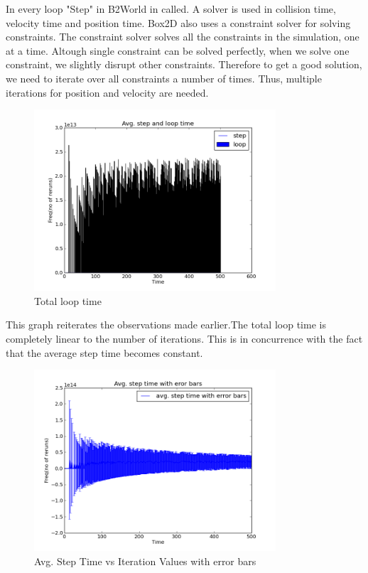 \documentclass[11pt]{article}
\begin{document}
In every loop "Step" in B2World in called. A solver is used in collision time, velocity time and position time. Box2D also uses a constraint solver for solving constraints. The constraint solver solves all the constraints in the simulation, one at a time. Altough single constraint can be solved perfectly, when we solve one constraint, we slightly disrupt other constraints. Therefore to get a good solution, we need to iterate over all constraints a number of times. Thus, multiple iterations for position and velocity are needed.

\begin{figure}[ht!]
\centering
\includegraphics[width=90mm]{g32_plot01.png}
\caption{Total loop time}
\label{overflow}
\end{figure}

This graph reiterates the observations made earlier.The total loop time is completely linear to the number of iterations. This is in concurrence with the fact that the average step time becomes constant.

\begin{figure}[ht!]
\centering
\includegraphics[width=90mm]{g32_plot03.png}
\caption{Avg. Step Time vs Iteration Values with error bars}
\label{overflow}
\end{figure}
\end{document}
